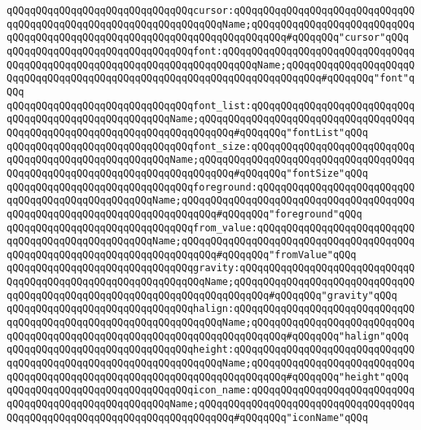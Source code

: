 \verb|qQQqqQQqqQQqqQQqqQQqqQQqqQQqqQQqcursor:qQQqqQQqqQQqqQQqqQQqqQQqqQQqqQQqqQQqqQQqqQQqqQQqqQQqqQQqqQQqqQQqqQQqName;qQQqqQQqqQQqqQQqqQQqqQQqqQQqqQQqqQQqqQQqqQQqqQQqqQQqqQQqqQQqqQQqqQQqqQQqqQQq#qQQqqQQq"cursor"qQQq|\newline
\newline
\verb|qQQqqQQqqQQqqQQqqQQqqQQqqQQqqQQqfont:qQQqqQQqqQQqqQQqqQQqqQQqqQQqqQQqqQQqqQQqqQQqqQQqqQQqqQQqqQQqqQQqqQQqqQQqqQQqName;qQQqqQQqqQQqqQQqqQQqqQQqqQQqqQQqqQQqqQQqqQQqqQQqqQQqqQQqqQQqqQQqqQQqqQQqqQQq#qQQqqQQq"font"qQQq|\newline
\verb|qQQqqQQqqQQqqQQqqQQqqQQqqQQqqQQqfont_list:qQQqqQQqqQQqqQQqqQQqqQQqqQQqqQQqqQQqqQQqqQQqqQQqqQQqqQQqName;qQQqqQQqqQQqqQQqqQQqqQQqqQQqqQQqqQQqqQQqqQQqqQQqqQQqqQQqqQQqqQQqqQQqqQQqqQQq#qQQqqQQq"fontList"qQQq|\newline
\verb|qQQqqQQqqQQqqQQqqQQqqQQqqQQqqQQqfont_size:qQQqqQQqqQQqqQQqqQQqqQQqqQQqqQQqqQQqqQQqqQQqqQQqqQQqqQQqName;qQQqqQQqqQQqqQQqqQQqqQQqqQQqqQQqqQQqqQQqqQQqqQQqqQQqqQQqqQQqqQQqqQQqqQQqqQQq#qQQqqQQq"fontSize"qQQq|\newline
\newline
\verb|qQQqqQQqqQQqqQQqqQQqqQQqqQQqqQQqforeground:qQQqqQQqqQQqqQQqqQQqqQQqqQQqqQQqqQQqqQQqqQQqqQQqqQQqName;qQQqqQQqqQQqqQQqqQQqqQQqqQQqqQQqqQQqqQQqqQQqqQQqqQQqqQQqqQQqqQQqqQQqqQQqqQQq#qQQqqQQq"foreground"qQQq|\newline
\verb|qQQqqQQqqQQqqQQqqQQqqQQqqQQqqQQqfrom_value:qQQqqQQqqQQqqQQqqQQqqQQqqQQqqQQqqQQqqQQqqQQqqQQqqQQqName;qQQqqQQqqQQqqQQqqQQqqQQqqQQqqQQqqQQqqQQqqQQqqQQqqQQqqQQqqQQqqQQqqQQqqQQqqQQq#qQQqqQQq"fromValue"qQQq|\newline
\verb|qQQqqQQqqQQqqQQqqQQqqQQqqQQqqQQqgravity:qQQqqQQqqQQqqQQqqQQqqQQqqQQqqQQqqQQqqQQqqQQqqQQqqQQqqQQqqQQqqQQqName;qQQqqQQqqQQqqQQqqQQqqQQqqQQqqQQqqQQqqQQqqQQqqQQqqQQqqQQqqQQqqQQqqQQqqQQqqQQq#qQQqqQQq"gravity"qQQq|\newline
\newline
\verb|qQQqqQQqqQQqqQQqqQQqqQQqqQQqqQQqhalign:qQQqqQQqqQQqqQQqqQQqqQQqqQQqqQQqqQQqqQQqqQQqqQQqqQQqqQQqqQQqqQQqqQQqName;qQQqqQQqqQQqqQQqqQQqqQQqqQQqqQQqqQQqqQQqqQQqqQQqqQQqqQQqqQQqqQQqqQQqqQQqqQQq#qQQqqQQq"halign"qQQq|\newline
\verb|qQQqqQQqqQQqqQQqqQQqqQQqqQQqqQQqheight:qQQqqQQqqQQqqQQqqQQqqQQqqQQqqQQqqQQqqQQqqQQqqQQqqQQqqQQqqQQqqQQqqQQqName;qQQqqQQqqQQqqQQqqQQqqQQqqQQqqQQqqQQqqQQqqQQqqQQqqQQqqQQqqQQqqQQqqQQqqQQqqQQq#qQQqqQQq"height"qQQq|\newline
\newline
\verb|qQQqqQQqqQQqqQQqqQQqqQQqqQQqqQQqicon_name:qQQqqQQqqQQqqQQqqQQqqQQqqQQqqQQqqQQqqQQqqQQqqQQqqQQqqQQqName;qQQqqQQqqQQqqQQqqQQqqQQqqQQqqQQqqQQqqQQqqQQqqQQqqQQqqQQqqQQqqQQqqQQqqQQqqQQq#qQQqqQQq"iconName"qQQq|\newline
